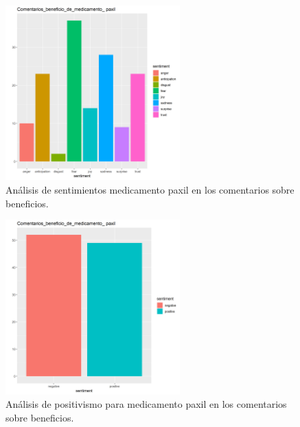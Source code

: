 \documentclass[spanish,]{article}
\begin{document}
\begin{figure}[h]
    \centering
    \includegraphics[width=0.6\textwidth]{figuras/sentimientos/Apaxil1.png}
    \caption{Análisis de sentimientos medicamento paxil en los comentarios sobre beneficios.}
    \label{fig:sentimientos:29}
\end{figure}

\begin{figure}[h]
    \centering
    \includegraphics[width=0.6\textwidth]{figuras/sentimientos/Apaxil2.png}
    \caption{Análisis de positivismo para medicamento paxil en los comentarios sobre beneficios.}
    \label{fig:sentimientos:30}
\end{figure}
\end{document}
